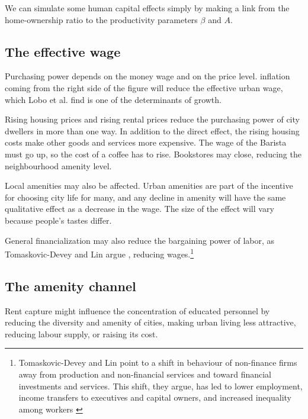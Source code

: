 We can simulate some human capital effects simply by making a link from the home-ownership ratio to the productivity parameters  $\beta$ and $A$. 

\subsection{The effective wage}

Purchasing power depends on the money wage and on the price level. inflation coming from the right side of the figure will reduce the effective urban wage, which Lobo et al. find is one of the determinants of growth. 

 Rising housing prices and rising rental prices reduce the purchasing power of city dwellers in more than one way. In addition to the direct effect, the rising housing costs make other goods and services more expensive. The wage of the Barista must go up, so the cost of a coffee has to rise. Bookstores may close, reducing the neighbourhood amenity level. 
 
 Local amenities may also be affected. Urban amenities  are part of the incentive for choosing city life for many, and any decline in amenity will have the same qualitative effect as a decrease in the wage. The size of the effect will vary because people's tastes differ. 


 General financialization may also reduce the bargaining power of labor, as Tomaskovic-Devey and Lin argue \cite{tomaskovic-deveyFinancializationCausesInequality2013}, reducing wages.\footnote{Tomaskovic-Devey and Lin point to a shift in behaviour of non-finance firms away from production and non-financial services and toward financial investments and services. This shift, they argue,  has led to lower employment, income transfers to executives and capital owners, and increased inequality among workers \cite{tomaskovic-deveyFinancializationCausesInequality2013}}


\subsection{The amenity channel}
Rent capture might influence the concentration of educated personnel by reducing the diversity and amenity of cities, making urban living less attractive, reducing labour supply, or raising its cost.



